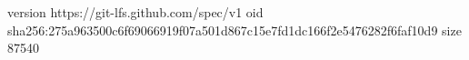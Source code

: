 version https://git-lfs.github.com/spec/v1
oid sha256:275a963500c6f69066919f07a501d867c15e7fd1dc166f2e5476282f6faf10d9
size 87540
